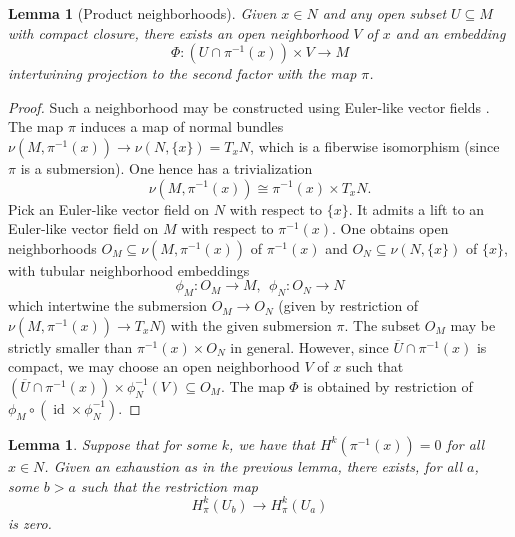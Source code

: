 \documentclass[11pt]{amsart}
\newtheorem{lemma}[theorem]{Lemma}
\theoremstyle{definition}
\theoremstyle{remark}
\newcommand{\on}{\operatorname}
\newcommand{\ol}{\overline}
\renewcommand{\subset}{\subseteq}
\begin{document}
\begin{lemma}[Product neighborhoods]
Given $x\in N$ and any open subset $U\subset M$ with compact closure, there exists an open neighborhood $V$ of $x$ and an embedding 
\[ 	\Phi\colon (U\cap \pi^{-1}(x))\times V\to M\]
intertwining projection to the second factor with the map $\pi$. 
\end{lemma}
\begin{proof}
	Such a neighborhood may be constructed using Euler-like vector fields \cite{bur:spl}. 
	The map $\pi$ induces a map of normal bundles 	$ \nu(M,\pi^{-1}(x))\to \nu(N,\{x\})=T_xN$, 
	which is a fiberwise isomorphism (since $\pi$ is a submersion). One hence has a trivialization
	\[
	\nu(M,\pi^{-1}(x))\cong \pi^{-1}(x)\times T_xN.
	\]
	Pick an Euler-like vector field on $N$ with respect to $\{x\}$. It admits a lift to an Euler-like vector field on $M$ with respect to $\pi^{-1}(x)$. One obtains open neighborhoods $O_M\subset \nu(M,\pi^{-1}(x))$ of $\pi^{-1}(x)$ 
	and $O_N\subset \nu(N,\{x\})$ of $\{x\}$,  with tubular neighborhood embeddings 
	\[ \phi_M\colon O_M\to M,\ \ \phi_N\colon O_N\to N\]
	which intertwine the submersion  $O_M\to O_N$ (given by restriction of $\nu(M,\pi^{-1}(x))\to  T_xN$) 
	with the given submersion $\pi$. The subset 
	$O_M$ may be strictly smaller than	$ \pi^{-1}(x)\times O_N$ in general. However, since $\ol{U}\cap \pi^{-1}(x)$ is compact, we 
	may choose an open neighborhood $V$ of $x$ such that $(\ol{U}\cap \pi^{-1}(x))\times \phi_N^{-1}(V)\subset O_M$. The map $\Phi$ is obtained by restriction of $\phi_M\circ (\on{id}\times \phi_N^{-1})$.
\end{proof}



\begin{lemma}\label{lem:3.6}
	Suppose that for some $k$, we have that 
	$H^k(\pi^{-1}(x))=0$ for all $x\in N$. Given an exhaustion as in the previous lemma, there exists, for all $a$, some $b>a$ such that the restriction map  
	\[ H^k_\pi(U_{b})\to H^k_\pi(U_a)\]
	is zero. 
\end{lemma}
\end{document}

